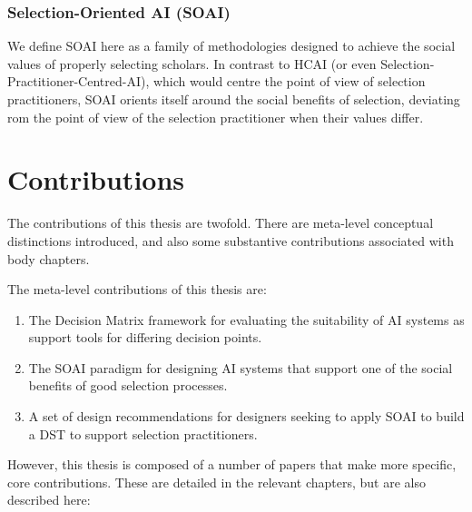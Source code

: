 \subsubsection{Selection-Oriented AI (SOAI)} 
We define SOAI here as a family of methodologies designed to achieve the social values of properly selecting scholars. In contrast to HCAI (or even Selection-Practitioner-Centred-AI), which would centre the point of view of selection practitioners, SOAI orients itself around the social benefits of selection, deviating rom the point of view of the selection practitioner when their values differ.

\section{Contributions} 
The contributions of this thesis are twofold. There are meta-level conceptual distinctions introduced, and also some substantive contributions associated with body chapters.

The meta-level contributions of this thesis are:

\begin{enumerate}
    \item The Decision Matrix framework for evaluating the suitability of AI systems as support tools for differing decision points.
    \item The SOAI paradigm for designing AI systems that support one of the social benefits of good selection processes.
    \item A set of design recommendations for designers seeking to apply SOAI to build a DST to support selection practitioners.
\end{enumerate}

However, this thesis is composed of a number of papers that make more specific, core contributions. These are detailed in the relevant chapters, but are also described here:

